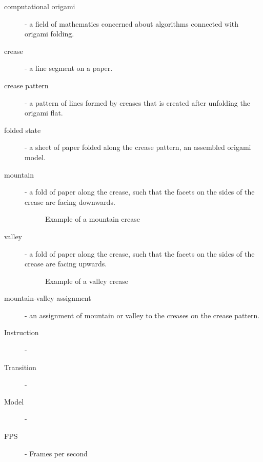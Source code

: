 \begin{description}
	\item[computational origami] \label{dictionary:computational-origami} - a field of mathematics concerned about algorithms connected with origami folding.
	\item[crease] - a line segment on a paper.
	\item[crease pattern] \label{dictionary:crease-pattern} - a pattern of lines formed by creases that is created after unfolding the origami flat.
	\item[folded state] \label{dictionary:folded-state} - a sheet of paper folded along the crease pattern, an assembled origami model.
	\item[mountain] - a fold of paper along the crease, such that the facets on the sides of the crease are facing downwards.
					\begin{figure}[H]
						\caption{Example of a mountain crease}
						\centering
					\end{figure}
	\item[valley] - a fold of paper along the crease, such that the facets on the sides of the crease are facing upwards.
					\begin{figure}[H]
						\caption{Example of a valley crease}
						\centering
					\end{figure}
	\item[mountain-valley assignment] - an assignment of mountain or valley to the creases on the crease pattern.
	\item[Instruction] - 
	\item[Transition] - 
	\item[Model] - 
	\item[FPS] - Frames per second
\end{description}

